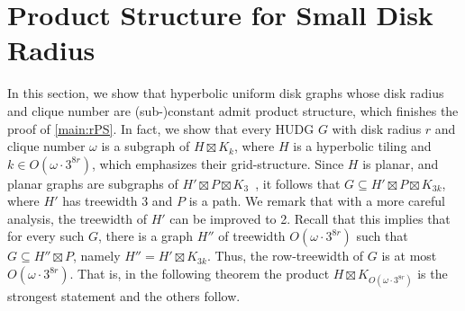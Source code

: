 \documentclass[11pt]{article}
\providecommand{\todo}[2][]{}
\newcommand{\thomas}[1]{}
\DeclareMathOperator{\tw}{tw}
\begin{document}
\section{Product Structure for Small Disk Radius}
\label{sec:upper_bound}
%
\newcommand{\upperBound}{3^{8r}}
%
%
%
In this section, we show that hyperbolic uniform disk graphs whose disk radius and clique number are (sub-)constant admit product structure, which finishes the proof of \cref{main:rPS}.
In fact, we show that every HUDG $ G $ with disk radius $ r $ and clique number $ \omega $ is a subgraph of $ H \boxtimes K_k $, where $ H $ is a hyperbolic tiling and $ k \in O(\omega \cdot \upperBound) $, which emphasizes their grid-structure.
Since $ H $ is planar, and planar graphs are subgraphs of $ H' \boxtimes P \boxtimes K_3 $~\cite{dujmovic_planar_2019}, it follows that $ G \subseteq H' \boxtimes P \boxtimes K_{3k} $, where $ H' $ has treewidth $ 3 $ and $ P $ is a path.
We remark that with a more careful analysis, the treewidth of $ H' $ can be improved to 2.
\todo{maybe do this}%
Recall that this implies that for every such $ G $, there is a graph $ H'' $ of treewidth $ O(\omega \cdot \upperBound) $ such that $ G \subseteq H'' \boxtimes P $, namely $ H'' = H' \boxtimes K_{3k} $.
Thus, the row-treewidth of $ G $ is at most $ O(\omega \cdot \upperBound) $.
That is, in the following theorem the product $ H \boxtimes K_{O(\omega \cdot \upperBound)} $ is the strongest statement and the others follow.
%
\end{document}
